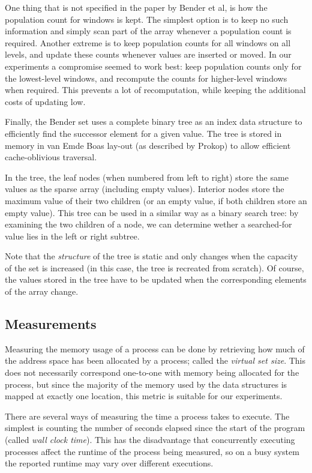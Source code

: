 \documentclass{acm_proc_article-sp}
\begin{document}
One thing that is not specified in the paper by Bender et al, is how the
population count for windows is kept. The simplest option is to keep no such
information and simply scan part of the array whenever a population count is
required. Another extreme is to keep population counts for all windows on all
levels, and update these counts whenever values are inserted or moved. In
our experiments a compromise seemed to work best: keep population counts only
for the lowest-level windows, and recompute the counts for higher-level windows
when required. This prevents a lot of recomputation, while keeping the additional
costs of updating low.

Finally, the Bender set uses a complete binary tree as an index data structure
to efficiently find the successor element for a given value. The tree is
stored in memory in van Emde Boas lay-out (as described by Prokop) to allow
efficient cache-oblivious traversal.

In the tree, the leaf nodes (when numbered from left to right) store the same values
as the sparse array (including empty values).
Interior nodes store the maximum value of their two children (or an empty value,
if both children store an empty value).
This tree can be used in a similar way as a binary search tree: by examining the
two children of a node, we can determine wether a searched-for value lies in the
left or right subtree.

Note that the \emph{structure} of the tree is static and only changes when the
capacity of the set is increased (in this case, the tree is recreated from scratch).
Of course, the values stored in the tree have to be updated when the corresponding
elements of the array change.

\subsection{Measurements}
Measuring the memory usage of a process can be done by retrieving how much of the
address space has been allocated by a process; called the \emph{virtual set
size}. This does not necessarily correspond one-to-one with memory being allocated for the process, but since the majority of the memory used by the
data structures is mapped at exactly one location, this metric is suitable
for our experiments.

There are several ways of measuring the time a process takes to execute.
The simplest is counting the number of seconds elapsed since the start of the
program (called \emph{wall clock time}).
This has the disadvantage that concurrently executing processes affect the runtime
of the process being measured, so on a busy system the reported runtime may vary
over different executions.
\end{document}
